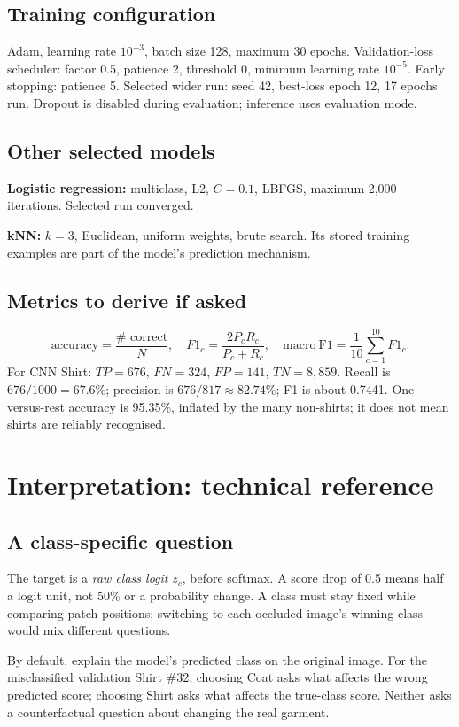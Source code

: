\documentclass[11pt,a4paper]{article}
\newcounter{question}
\begin{document}
\subsection{Training configuration}
Adam, learning rate $10^{-3}$, batch size 128, maximum 30 epochs. Validation-loss scheduler: factor 0.5, patience 2, threshold 0, minimum learning rate $10^{-5}$. Early stopping: patience 5. Selected wider run: seed 42, best-loss epoch 12, 17 epochs run. Dropout is disabled during evaluation; inference uses evaluation mode.
\subsection{Other selected models}
\textbf{Logistic regression:} multiclass, L2, $C=0.1$, LBFGS, maximum 2,000 iterations. Selected run converged.\par
\textbf{kNN:} $k=3$, Euclidean, uniform weights, brute search. Its stored training examples are part of the model's prediction mechanism.
\subsection{Metrics to derive if asked}
\[
\mathrm{accuracy}=\frac{\#\text{ correct}}{N},\quad
F1_c=\frac{2P_cR_c}{P_c+R_c},\quad
\mathrm{macro\ F1}=\frac1{10}\sum_{c=1}^{10}F1_c.
\]
For CNN Shirt: $TP=676$, $FN=324$, $FP=141$, $TN=8,859$. Recall is $676/1000=67.6\%$; precision is $676/817\approx82.74\%$; F1 is about 0.7441. One-versus-rest accuracy is 95.35\%, inflated by the many non-shirts; it does not mean shirts are reliably recognised.

\clearpage\section{Interpretation: technical reference}
\subsection{A class-specific question}
The target is a \emph{raw class logit} $z_c$, before softmax. A score drop of 0.5 means half a logit unit, not 50\% or a probability change. A class must stay fixed while comparing patch positions; switching to each occluded image's winning class would mix different questions.

By default, explain the model's predicted class on the original image. For the misclassified validation Shirt \#32, choosing Coat asks what affects the wrong predicted score; choosing Shirt asks what affects the true-class score. Neither asks a counterfactual question about changing the real garment.
\end{document}
